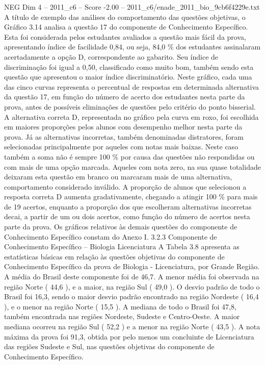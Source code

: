 \begin{textsample}{NEG Dim 4 – 2011\_c6 – Score -2.00 – 2011\_c6/enade\_2011\_bio\_9cb6f4229e.txt}
A título de exemplo das análises do comportamento das questões objetivas, o Gráfico 3.14 analisa a questão 17 do componente de Conhecimento Específico.
Esta foi considerada pelos estudantes avaliados a questão mais fácil da prova, apresentando índice de facilidade 0,84, ou seja, 84,0 \% dos estudantes assinalaram acertadamente a opção D, correspondente ao gabarito.
Seu índice de discriminação foi igual a 0,50, classificado como muito bom, também sendo esta questão que apresentou o maior índice discriminatório.
Neste gráfico, cada uma das cinco curvas representa o percentual de respostas em determinada alternativa da questão 17, em função do número de acerto dos estudantes nesta parte da prova, antes de possíveis eliminações de questões pelo critério do ponto bisserial.
A alternativa correta D, representada no gráfico pela curva em roxo, foi escolhida em maiores proporções pelos alunos com desempenho melhor nesta parte da prova.
Já as alternativas incorretas, também denominadas distratores, foram selecionadas principalmente por aqueles com notas mais baixas.
Neste caso também a soma não é sempre 100 \% por causa das questões não respondidas ou com mais de uma opção marcada.
Aqueles com nota zero, na sua quase totalidade deixaram esta questão em branco ou marcaram mais de uma alternativa, comportamento considerado inválido.
A proporção de alunos que selecionou a resposta correta D aumenta gradativamente, chegando a atingir 100 \% para mais de 19 acertos, enquanto a proporção dos que escolheram alternativas incorretas decai, a partir de um ou dois acertos, como função do número de acertos nesta parte da prova.
Os gráficos relativos às demais questões do componente de Conhecimento Específico constam do Anexo I. 3.2.3 Componente de Conhecimento Específico – Biologia Licenciatura A Tabela 3.8 apresenta as estatísticas básicas em relação às questões objetivas do componente de Conhecimento Específico da prova de Biologia - Licenciatura, por Grande Região.
A média do Brasil deste componente foi de 46,7.
A menor média foi observada na região Norte ( 44,6 ), e a maior, na região Sul ( 49,0 ).
O desvio padrão de todo o Brasil foi 16,3, sendo o maior desvio padrão encontrado na região Nordeste ( 16,4 ), e o menor na região Norte ( 15,5 ).
A mediana de todo o Brasil foi 47,8, também encontrada nas regiões Nordeste, Sudeste e Centro-Oeste.
A maior mediana ocorreu na região Sul ( 52,2 ) e a menor na região Norte ( 43,5 ).
A nota máxima da prova foi 91,3, obtida por pelo menos um concluinte de Licenciatura das regiões Sudeste e Sul, nas questões objetivas do componente de Conhecimento Específico.

\end{textsample}
